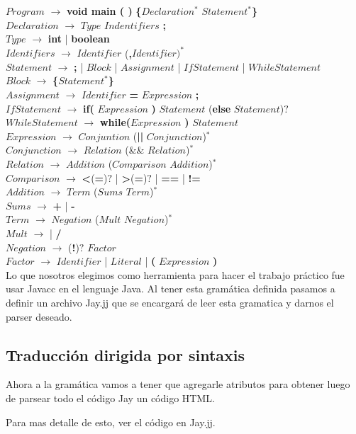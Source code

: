 \noindent$Program$ $\rightarrow$ {\bf void main ( )} {\bf \{}$Declaration^{*}$ $Statement^{*}${\bf \} } \\
$Declaration$ $\rightarrow$ $Type$ $Indentifiers$ {\bf ;}\\
$Type$ $\rightarrow$ {\bf int} | {\bf boolean}\\
$Identifiers$ $\rightarrow$ $Identifier$ ({\bf ,}$Identifier)^{*}$\\
$Statement$ $\rightarrow$ {\bf ;} | $Block$ | $Assignment$ | $IfStatement$ | $WhileStatement$\\
$Block$ $\rightarrow$ {\bf \{}$Statement^{*}${\bf \}}\\
$Assignment$ $\rightarrow$ $Identifier$ {\bf =} $Expression$ {\bf ;}\\
$IfStatement$ $\rightarrow$ {\bf if(} $Expression$ {\bf )} $Statement$ ({\bf else} $Statement$)$?$\\
$WhileStatement$ $\rightarrow$ {\bf while(}$Expression$ {\bf )} $Statement$\\
$Expression$ $\rightarrow$ $Conjuntion$ ({\bf ||} $Conjunction$)$^{*}$\\
$Conjunction$ $\rightarrow$ $Relation$ (\&\& $Relation$)$^{*}$\\
$Relation$ $\rightarrow$ $Addition$ ($Comparison$ $Addition$)$^{*}$\\
$Comparison$ $\rightarrow$ {\bf <}({\bf =})$?$ | {\bf >}({\bf =})$?$  | {\bf ==} | {\bf !=}\\
$Addition$ $\rightarrow$  $Term$ ($Sums$ $Term$)$^{*}$\\
$Sums$ $\rightarrow$ {\bf +} | {\bf -}\\
$Term$ $\rightarrow$ $Negation$ ($Mult$ $Negation$)$^{*}$\\
$Mult$ $\rightarrow$ {\bf *} | {\bf /}\\
$Negation$ $\rightarrow$ ({\bf !})$?$ $Factor$\\
$Factor$ $\rightarrow$ $Identifier$ | $Literal$ | {\bf (} $Expression$ {\bf )}\\


Lo que nosotros elegimos como herramienta para hacer el trabajo práctico fue usar Javacc en el lenguaje Java. Al
tener esta gramática definida pasamos a definir un archivo Jay.jj que se encargará de leer esta gramatica y darnos el parser
deseado.

\subsection{Traducción dirigida por sintaxis}

Ahora a la gramática vamos a tener que agregarle atributos para obtener luego de parsear todo el código Jay un código HTML.

Para mas detalle de esto, ver el código en Jay.jj.




